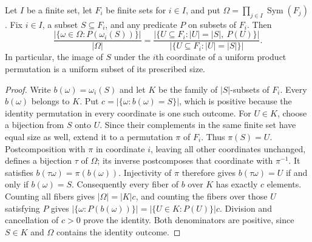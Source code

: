 \begin{lemma}
Let $I$ be a finite set, let $F_i$ be finite sets for $i\in I$, and put
$\Omega=\prod_{j\in I}\operatorname{Sym}(F_j)$. Fix $i\in I$, a subset
$S\subseteq F_i$, and any predicate $P$ on subsets of $F_i$. Then
\[
 \frac{|\{\omega\in\Omega:P(\omega_i(S))\}|}{|\Omega|}
 =\frac{|\{U\subseteq F_i:|U|=|S|,\ P(U)\}|}
 {|\{U\subseteq F_i:|U|=|S|\}|}.
\]
In particular, the image of $S$ under the $i$th coordinate of a uniform
product permutation is a uniform subset of its prescribed size.
\end{lemma}
\begin{proof}
Write $b(\omega)=\omega_i(S)$ and let $K$ be the family of $|S|$-subsets
of $F_i$. Every $b(\omega)$ belongs to $K$. Put
$c=|\{\omega:b(\omega)=S\}|$, which is positive because the identity
permutation in every coordinate is one such outcome.
For $U\in K$, choose a bijection from $S$ onto $U$. Since their
complements in the same finite set have equal size as well, extend it
to a permutation $\pi$ of $F_i$. Thus $\pi(S)=U$.
Postcomposition with $\pi$ in coordinate $i$, leaving all other
coordinates unchanged, defines a bijection $\tau$ of $\Omega$;
its inverse postcomposes that coordinate with $\pi^{-1}$.
It satisfies $b(\tau\omega)=\pi(b(\omega))$. Injectivity of $\pi$
therefore gives $b(\tau\omega)=U$ if and only if $b(\omega)=S$.
Consequently every fiber of $b$ over $K$ has exactly $c$ elements.
Counting all fibers gives $|\Omega|=|K|c$, and counting the fibers
over those $U$ satisfying $P$ gives $|\{\omega:P(b(\omega))\}|=
|\{U\in K:P(U)\}|c$. Division and cancellation of $c>0$ prove the
identity. Both denominators are positive, since $S\in K$ and
$\Omega$ contains the identity outcome.
\end{proof}
